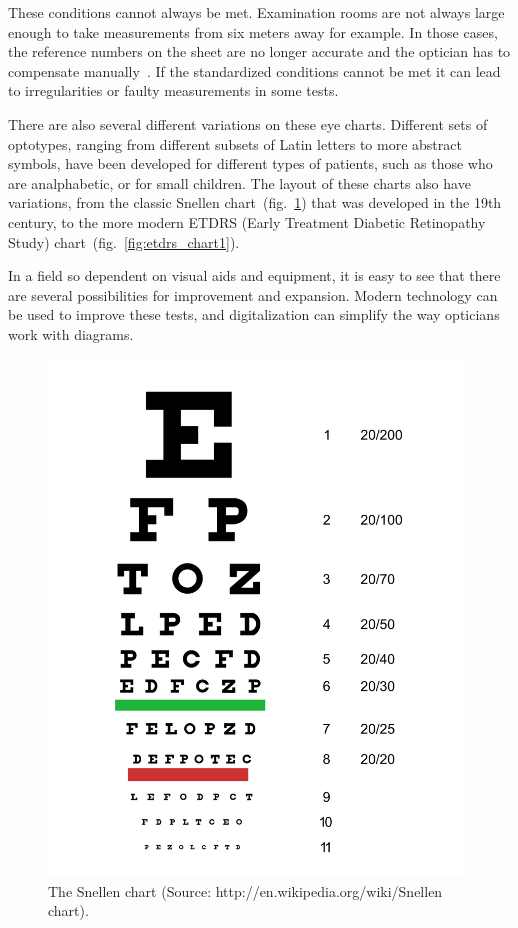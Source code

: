 \documentclass[12pt,a4paper,notitlepage]{report}
\begin{document}
These conditions cannot always be met. Examination rooms are not always large enough to take measurements from six meters away for example. In those cases, the reference numbers on the sheet are no longer accurate and the optician has to compensate manually~\cite{PGSoderbergOral}. If the standardized conditions cannot be met it can lead to irregularities or faulty measurements in some tests.

There are also several different variations on these eye charts. Different sets of optotypes, ranging from different subsets of Latin letters to more abstract symbols, have been developed for different types of patients, such as those who are analphabetic, or for small children. The layout of these charts also have variations, from the classic Snellen chart~(fig.~\ref{fig:snellen_chart1}) that was developed in the 19th century, to the more modern ETDRS (Early Treatment Diabetic Retinopathy Study) chart~(fig.~\ref{fig:etdrs_chart1}).


In a field so dependent on visual aids and equipment, it is easy to see that there are several possibilities for improvement and expansion. Modern technology can be used to improve these tests, and digitalization can simplify the way opticians work with diagrams.

\begin{figure}[ht!]
\centering
\includegraphics[width=110mm]{images/Snellen_chart.png}
\caption[The Snellen chart]{The Snellen chart (Source: http://en.wikipedia.org/wiki/Snellen chart\cite{img_snellen}).} \label{fig:snellen_chart1}
\end{figure} 
\end{document}
